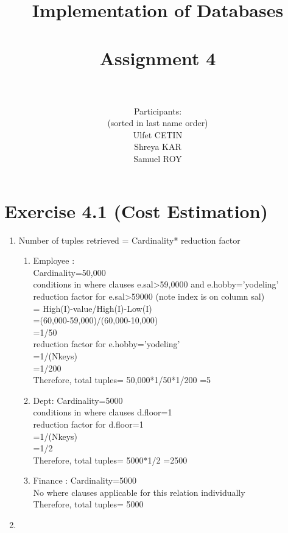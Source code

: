 \documentclass[10pt]{article}
\title{Implementation of Databases \\ ~~~ \\ Assignment 4 \\ ~~~ \\ }
\author{
	Participants:\\
	(sorted in last name order)\\
	Ulfet CETIN\\ 
	Shreya KAR\\
	Samuel ROY\\	
}
\date{}
\begin{document}
	\maketitle
	
	\clearpage
	
	\section*{Exercise 4.1 (Cost Estimation)}

	
	\begin{enumerate}
		\item
		Number of tuples retrieved = Cardinality* reduction factor
		\begin{enumerate}
		    \item Employee : 
		    \\Cardinality=50,000
		    \\conditions in where clauses e.sal>59,0000 and e.hobby='yodeling'
		    \\reduction factor for e.sal>59000 (note index is on column sal)
		    \\= High(I)-value/High(I)-Low(I) 
		   \\ =(60,000-59,000)/(60,000-10,000)
		   \\ =1/50
		    \\
		    reduction factor for e.hobby='yodeling'
		    \\=1/(Nkeys)
		    \\=1/200
		    \\Therefore, total tuples= 50,000*1/50*1/200
		    =5
		    \item
		    Dept:
		    Cardinality=5000
		    \\conditions in where clauses d.floor=1
		   \\ reduction factor for d.floor=1
		    \\=1/(Nkeys)
		    \\=1/2
		    \\Therefore, total tuples= 5000*1/2
		    =2500
		    \item
		    Finance :
		    Cardinality=5000
		    \\No where clauses applicable for this relation individually
		    \\Therefore, total tuples= 5000
		    
		    
		    
		\end{enumerate}
		
		\item 
		

\end{enumerate}
\end{document}
